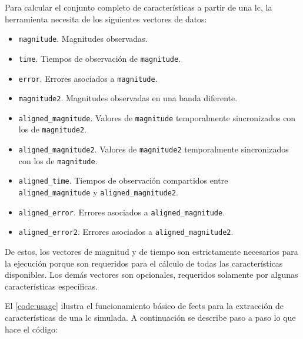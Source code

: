Para calcular el conjunto completo de características a partir de una \gls{lc}, la herramienta necesita de los siguientes vectores de datos:
\begin{itemize}
    \item \texttt{magnitude}. Magnitudes observadas.
    \item \texttt{time}. Tiempos de observación de \texttt{magnitude}.
    \item \texttt{error}. Errores asociados a \texttt{magnitude}.
    \item \texttt{magnitude2}. Magnitudes observadas en una banda diferente.
    \item \texttt{aligned\_magnitude}. Valores de \texttt{magnitude} temporalmente sincronizados con los de \texttt{magnitude2}.
    \item \texttt{aligned\_magnitude2}. Valores de \texttt{magnitude2} temporalmente sincronizados con los de \texttt{magnitude}.
    \item \texttt{aligned\_time}. Tiempos de observación compartidos entre \texttt{a\-ligned\_mag\-ni\-tude} y \texttt{aligned\_magnitude2}.
    \item \texttt{aligned\_error}. Errores asociados a \texttt{aligned\_magnitude}.
    \item \texttt{aligned\_error2}. Errores asociados a \texttt{aligned\_magnitude2}.
\end{itemize}
De estos, los vectores de magnitud y de tiempo son estrictamente necesarios para la ejecución porque son requeridos para el cálculo de todas las características disponibles. Los demás vectores son opcionales, requeridos solamente por algunas características específicas.

El \autoref{code:usage} ilustra el funcionamiento básico de \gls{feets} para la extracción de características de una \gls{lc} simulada. A continuación se describe paso a paso lo que hace el código:

